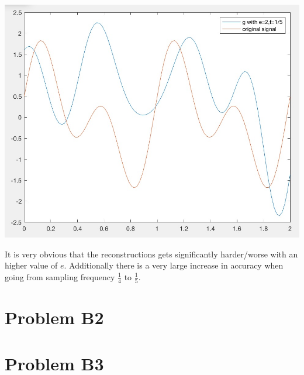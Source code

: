 \documentclass[12pt]{article}
\begin{document}
\begin{enumerate}[a)]
\begin{centering}
        \includegraphics[scale = 0.3]{figures/e20-f15}\\
        \end{centering}

        It is very obvious that the reconstructions gets significantly harder/worse with an higher value of $e$. Additionally there is a very large increase in accuracy when going from sampling frequency $\frac{1}{4}$ to $\frac{1}{5}$.


\end{enumerate}
\section*{Problem B2}


\section*{Problem B3}
\end{document}
